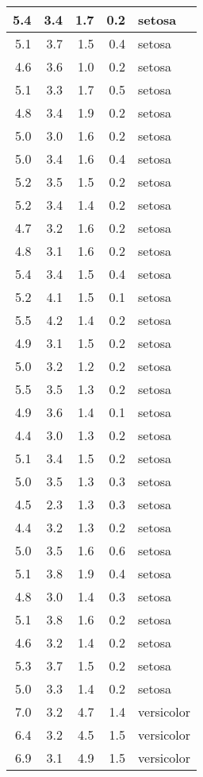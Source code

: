 \documentclass[a4paper, 10pt]{article}\usepackage[]{graphicx}\usepackage[]{color}
\begin{document}
\begin{tabular}{r|r|r|r|l}
\hline
5.4 & 3.4 & 1.7 & 0.2 & setosa\\
\hline
5.1 & 3.7 & 1.5 & 0.4 & setosa\\
\hline
4.6 & 3.6 & 1.0 & 0.2 & setosa\\
\hline
5.1 & 3.3 & 1.7 & 0.5 & setosa\\
\hline
4.8 & 3.4 & 1.9 & 0.2 & setosa\\
\hline
5.0 & 3.0 & 1.6 & 0.2 & setosa\\
\hline
5.0 & 3.4 & 1.6 & 0.4 & setosa\\
\hline
5.2 & 3.5 & 1.5 & 0.2 & setosa\\
\hline
5.2 & 3.4 & 1.4 & 0.2 & setosa\\
\hline
4.7 & 3.2 & 1.6 & 0.2 & setosa\\
\hline
4.8 & 3.1 & 1.6 & 0.2 & setosa\\
\hline
5.4 & 3.4 & 1.5 & 0.4 & setosa\\
\hline
5.2 & 4.1 & 1.5 & 0.1 & setosa\\
\hline
5.5 & 4.2 & 1.4 & 0.2 & setosa\\
\hline
4.9 & 3.1 & 1.5 & 0.2 & setosa\\
\hline
5.0 & 3.2 & 1.2 & 0.2 & setosa\\
\hline
5.5 & 3.5 & 1.3 & 0.2 & setosa\\
\hline
4.9 & 3.6 & 1.4 & 0.1 & setosa\\
\hline
4.4 & 3.0 & 1.3 & 0.2 & setosa\\
\hline
5.1 & 3.4 & 1.5 & 0.2 & setosa\\
\hline
5.0 & 3.5 & 1.3 & 0.3 & setosa\\
\hline
4.5 & 2.3 & 1.3 & 0.3 & setosa\\
\hline
4.4 & 3.2 & 1.3 & 0.2 & setosa\\
\hline
5.0 & 3.5 & 1.6 & 0.6 & setosa\\
\hline
5.1 & 3.8 & 1.9 & 0.4 & setosa\\
\hline
4.8 & 3.0 & 1.4 & 0.3 & setosa\\
\hline
5.1 & 3.8 & 1.6 & 0.2 & setosa\\
\hline
4.6 & 3.2 & 1.4 & 0.2 & setosa\\
\hline
5.3 & 3.7 & 1.5 & 0.2 & setosa\\
\hline
5.0 & 3.3 & 1.4 & 0.2 & setosa\\
\hline
7.0 & 3.2 & 4.7 & 1.4 & versicolor\\
\hline
6.4 & 3.2 & 4.5 & 1.5 & versicolor\\
\hline
6.9 & 3.1 & 4.9 & 1.5 & versicolor\\

\end{tabular}
\end{document}
